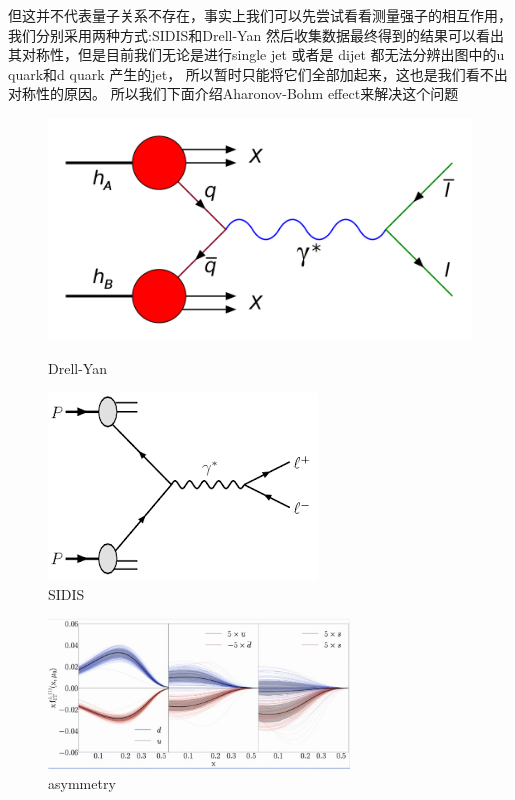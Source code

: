 \documentclass[12pt, a4paper, oneside]{ctexart}
\begin{document}
\begin{spacing}{2.0}
\begin{figure}
\end{figure}
但这并不代表量子关系不存在，事实上我们可以先尝试看看测量强子的相互作用，我们分别采用两种方式:SIDIS和Drell-Yan
然后收集数据最终得到的结果可以看出其对称性，但是目前我们无论是进行single jet 或者是 dijet 都无法分辨出图中的u quark和d quark 产生的jet，
所以暂时只能将它们全部加起来，这也是我们看不出对称性的原因。
所以我们下面介绍Aharonov-Bohm effect来解决这个问题

\begin{figure}
    \begin{minipage}[t]{0.5\linewidth}
        \centering
        \includegraphics[scale=0.1]{drellyan.png}
        \caption{Drell-Yan}
        \label{fig:side:a}
      \end{minipage}%
      \begin{minipage}[t]{0.5\linewidth}
        \centering
        \includegraphics[scale=0.3]{SIDIS.png}
        \caption{SIDIS}
        \label{fig:side:b}
      \end{minipage}
\end{figure}
\begin{figure}
    \centering
    \includegraphics[width=8cm]{theta.jpg}
    \caption{asymmetry}    
\end{figure}



\end{spacing}
\end{document}
